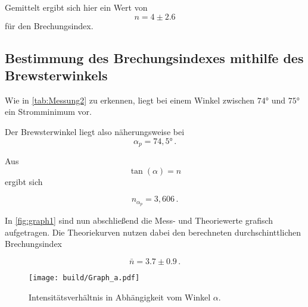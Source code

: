 Gemittelt ergibt sich hier ein Wert von
\begin{equation*}
    n = 4 \pm 2.6
\end{equation*}
für den Brechungsindex.

\subsection{Bestimmung des Brechungsindexes mithilfe des Brewsterwinkels}

Wie in \autoref{tab:Messung2} zu erkennen, liegt bei einem Winkel zwischen $74°$ und $75°$ ein Stromminimum vor.

Der Brewsterwinkel liegt also näherungsweise bei
\begin{equation*}
    \alpha_p = 74,5 ° \,.
\end{equation*}

Aus
\begin{equation*}
    \tan(\alpha) = n 
\end{equation*}
ergibt sich

\begin{equation*}
    n_{\alpha_p} = 3,606 \,.
\end{equation*}

In \autoref{fig:graph1} sind nun abschließend die Mess- und Theoriewerte grafisch aufgetragen. Die Theoriekurven nutzen dabei den berechneten durchschinttlichen Brechungsindex

\begin{equation*}
    \bar{n} = 3.7 \pm 0.9 \,.
\end{equation*}

\begin{figure}
    \centering
    \texttt{[image: build/Graph\_a.pdf]}
    \caption{Intensitätsverhältnis in Abhängigkeit vom Winkel $\alpha$.}
    \label{fig:graph1}
\end{figure}
